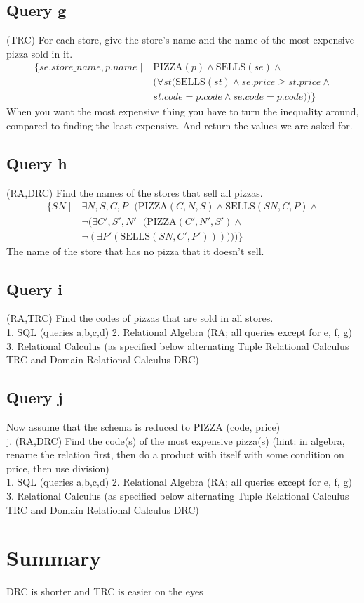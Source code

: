 \documentclass{article}
\theoremstyle{remark}
\numberwithin{equation}{section}
\begin{document}
\subsection{Query g}
(TRC) For each store, give the store’s name and the name of the most expensive pizza sold in it.\\
\begin{align*}
    \{se.store\_name, p.name \mid &\text{PIZZA}(p) \wedge \text{SELLS}(se) \wedge
    \\&(\forall st (\text{SELLS}(st)\wedge se.price\geq st.price \wedge
    \\&st.code=p.code \wedge se.code=p.code)) \}
\end{align*}
When you want the most expensive thing you have to turn the inequality around, compared to finding the least expensive. And return the values we are asked for.
\subsection{Query h}
(RA,DRC) Find the names of the stores that sell all pizzas.\\
\begin{align*}
    \{SN \mid &\exists  N,S,C,P \text{ }( \text{PIZZA}(C,N,S) \wedge \text{SELLS}(SN,C,P)\wedge\\
    &\neg(\exists C',S',N' \text{ }( \text{PIZZA}(C',N',S') \wedge\\ &\neg (\exists P'( \text{SELLS}(SN,C',P') ))))
    )\}
\end{align*}
The name of the store that has no pizza that it doesn't sell.
\subsection{Query i}
(RA,TRC) Find the codes of pizzas that are sold in all stores.\\
1. SQL (queries a,b,c,d)
2. Relational Algebra (RA; all queries except for e, f, g)
3. Relational Calculus (as specified below alternating Tuple Relational Calculus TRC and Domain Relational
Calculus DRC)
\subsection{Query j}
Now assume that the schema is reduced to PIZZA (code, price)\\
j. (RA,DRC) Find the code(s) of the most expensive pizza(s) (hint: in algebra, rename the relation first,
then do a product with itself with some condition on price, then use division)\\
1. SQL (queries a,b,c,d)
2. Relational Algebra (RA; all queries except for e, f, g)
3. Relational Calculus (as specified below alternating Tuple Relational Calculus TRC and Domain Relational
Calculus DRC)

\section{Summary}
DRC is shorter and TRC is easier on the eyes
\end{document}
